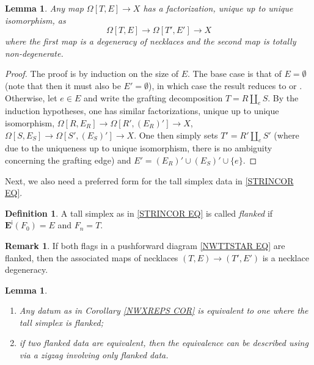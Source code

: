 \documentclass[a4paper,10pt
,draft
]{article}%
\numberwithin{equation}{section}
\numberwithin{figure}{section}
\newtheorem{lemma}[equation]{Lemma}%
\theoremstyle{definition} %
\newtheorem{definition}[equation]{Definition}%
\newtheorem{remark}[equation]{Remark}%
\newcommand{\1}{\ensuremath{\mathbbm 1}}%
\begin{document}
\begin{lemma}\label{DEGNECK LEM}
	Any map 
	$\Omega[T,E] \to X$
	has a factorization, unique up to unique isomorphism, as
\[
	\Omega[T,E] \to \Omega[T',E'] \to X
\]
where the first map is a degeneracy of necklaces
and the second map is totally non-degenerate.
\end{lemma}


\begin{proof}
	The proof is by induction on the size of $E$.
	The base case is that of $E = \emptyset$
	(note that then it must also be $E'=\emptyset$),
	in which case the result reduces to 
	\cite[Prop. 6.9]{CM11} or
	\cite[Prop. 5.62]{Per18}.
	Otherwise, let $e \in E$
	and write the grafting decomposition
	$T = R \amalg_e S$.
	By the induction hypotheses, one has similar factorizations, unique up to unique isomorphism,
	$\Omega[R,E_R] \to \Omega[R',(E_R)'] \to X$,
	$\Omega[S,E_S] \to \Omega[S',(E_S)'] \to X$.
	One then simply sets 
	$T' = R' \amalg_e S'$
	(where due to the uniqueness up to unique isomorphism, there is no ambiguity concerning the grafting edge)
	and $E' = (E_R)' \cup (E_S)' \cup \{e\}$.
\end{proof}



Next, we also need a preferred form for the tall simplex data in \eqref{STRINCOR EQ}.



\begin{definition}
	A tall simplex as in 
	\eqref{STRINCOR EQ}
	is called \emph{flanked}
	if $\boldsymbol{E}^{\mathsf{i}}(F_0) = E$
	and $F_n = T$.
\end{definition}


\begin{remark}
	If both flags in a pushforward diagram
	\eqref{NWTTSTAR EQ}
	are flanked,
	then the associated maps of necklaces
	$(T,E) \to (T',E')$
	is a necklace degeneracy.
\end{remark}


\begin{lemma}\label{FLANKING LEM}
	\begin{enumerate}[label=(\roman*)]
	\item Any datum as in Corollary \ref{NWXREPS COR} is equivalent to one where the tall simplex is flanked;
	\item if two flanked data are equivalent, then the equivalence can be described using via a zigzag involving only flanked data.
	\end{enumerate}
\end{lemma}
\end{document}
